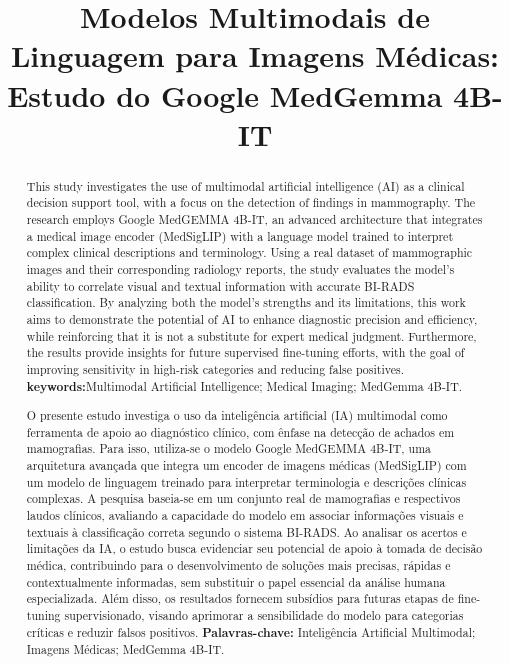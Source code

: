 \documentclass[12pt]{article}
\title{Modelos Multimodais de Linguagem para Imagens Médicas: Estudo do Google MedGemma 4B-IT}
\begin{document}
\maketitle

\begin{abstract}
This study investigates the use of multimodal artificial intelligence (AI) as a clinical decision support tool, with a focus on the detection of findings in mammography. The research employs Google MedGEMMA 4B-IT, an advanced architecture that integrates a medical image encoder (MedSigLIP) with a language model trained to interpret complex clinical descriptions and terminology. Using a real dataset of mammographic images and their corresponding radiology reports, the study evaluates the model's ability to correlate visual and textual information with accurate BI-RADS classification. By analyzing both the model's strengths and its limitations, this work aims to demonstrate the potential of AI to enhance diagnostic precision and efficiency, while reinforcing that it is not a substitute for expert medical judgment. Furthermore, the results provide insights for future supervised fine-tuning efforts, with the goal of improving sensitivity in high-risk categories and reducing false positives.
\textbf{keywords:}Multimodal Artificial Intelligence; Medical Imaging; MedGemma 4B-IT.
\end{abstract}


\renewcommand{\abstractname}{Resumo}

\begin{abstract}
 O presente estudo investiga o uso da inteligência artificial (IA) multimodal como ferramenta de apoio ao diagnóstico clínico, com ênfase na detecção de achados em mamografias. Para isso, utiliza-se o modelo Google MedGEMMA 4B-IT, uma arquitetura avançada que integra um encoder de imagens médicas (MedSigLIP) com um modelo de linguagem treinado para interpretar terminologia e descrições clínicas complexas. A pesquisa baseia-se em um conjunto real de mamografias e respectivos laudos clínicos, avaliando a capacidade do modelo em associar informações visuais e textuais à classificação correta segundo o sistema BI-RADS. Ao analisar os acertos e limitações da IA, o estudo busca evidenciar seu potencial de apoio à tomada de decisão médica, contribuindo para o desenvolvimento de soluções mais precisas, rápidas e contextualmente informadas, sem substituir o papel essencial da análise humana especializada. Além disso, os resultados fornecem subsídios para futuras etapas de fine-tuning supervisionado, visando aprimorar a sensibilidade do modelo para categorias críticas e reduzir falsos positivos.
\textbf{Palavras-chave:} Inteligência Artificial Multimodal; Imagens Médicas; MedGemma 4B-IT.

\end{abstract}
\end{document}
